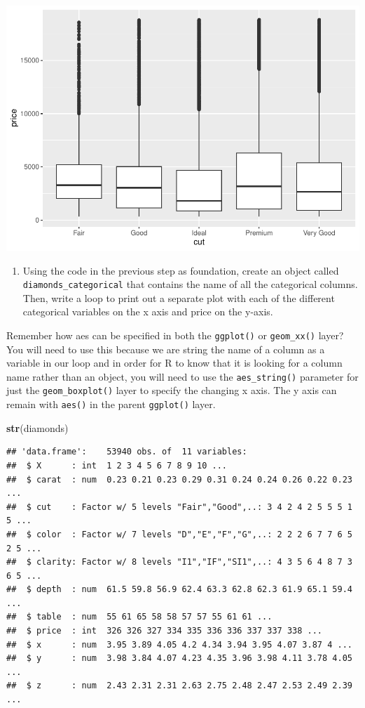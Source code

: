 \documentclass[
]{book}
\newenvironment{Shaded}{\begin{snugshade}}{\end{snugshade}}
\newcommand{\FunctionTok}[1]{\textcolor[rgb]{0.13,0.29,0.53}{\textbf{#1}}}
\newcommand{\NormalTok}[1]{#1}
\providecommand{\tightlist}{%
  \setlength{\itemsep}{0pt}\setlength{\parskip}{0pt}}
\begin{document}
\includegraphics{_main_files/figure-latex/unnamed-chunk-107-1.pdf}

\begin{enumerate}
\def\labelenumi{\arabic{enumi}.}
\setcounter{enumi}{2}
\tightlist
\item
  Using the code in the previous step as foundation, create an object called \texttt{diamonds\_categorical} that contains the name of all the categorical columns. Then, write a loop to print out a separate plot with each of the different categorical variables on the x axis and price on the y-axis.
\end{enumerate}

Remember how aes can be specified in both the \texttt{ggplot()} or \texttt{geom\_xx()} layer? You will need to use this because we are string the name of a column as a variable in our loop and in order for R to know that it is looking for a column name rather than an object, you will need to use the \texttt{aes\_string()} parameter for just the \texttt{geom\_boxplot()} layer to specify the changing x axis. The y axis can remain with \texttt{aes()} in the parent \texttt{ggplot()} layer.

\begin{Shaded}
\begin{Highlighting}[]
\FunctionTok{str}\NormalTok{(diamonds)}
\end{Highlighting}
\end{Shaded}

\begin{verbatim}
## 'data.frame':    53940 obs. of  11 variables:
##  $ X      : int  1 2 3 4 5 6 7 8 9 10 ...
##  $ carat  : num  0.23 0.21 0.23 0.29 0.31 0.24 0.24 0.26 0.22 0.23 ...
##  $ cut    : Factor w/ 5 levels "Fair","Good",..: 3 4 2 4 2 5 5 5 1 5 ...
##  $ color  : Factor w/ 7 levels "D","E","F","G",..: 2 2 2 6 7 7 6 5 2 5 ...
##  $ clarity: Factor w/ 8 levels "I1","IF","SI1",..: 4 3 5 6 4 8 7 3 6 5 ...
##  $ depth  : num  61.5 59.8 56.9 62.4 63.3 62.8 62.3 61.9 65.1 59.4 ...
##  $ table  : num  55 61 65 58 58 57 57 55 61 61 ...
##  $ price  : int  326 326 327 334 335 336 336 337 337 338 ...
##  $ x      : num  3.95 3.89 4.05 4.2 4.34 3.94 3.95 4.07 3.87 4 ...
##  $ y      : num  3.98 3.84 4.07 4.23 4.35 3.96 3.98 4.11 3.78 4.05 ...
##  $ z      : num  2.43 2.31 2.31 2.63 2.75 2.48 2.47 2.53 2.49 2.39 ...
\end{verbatim}
\end{document}
